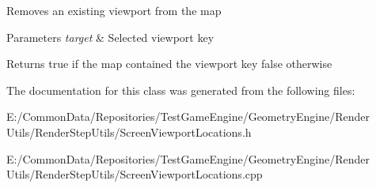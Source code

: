 Removes an existing viewport from the map 
\begin{DoxyParams}{Parameters}
{\em target} & Selected viewport key \\
\hline
\end{DoxyParams}
\begin{DoxyReturn}{Returns}
true if the map contained the viewport key false otherwise 
\end{DoxyReturn}


The documentation for this class was generated from the following files\+:\begin{DoxyCompactItemize}
\item 
E\+:/\+Common\+Data/\+Repositories/\+Test\+Game\+Engine/\+Geometry\+Engine/\+Render Utils/\+Render\+Step\+Utils/Screen\+Viewport\+Locations.\+h\item 
E\+:/\+Common\+Data/\+Repositories/\+Test\+Game\+Engine/\+Geometry\+Engine/\+Render Utils/\+Render\+Step\+Utils/Screen\+Viewport\+Locations.\+cpp\end{DoxyCompactItemize}
